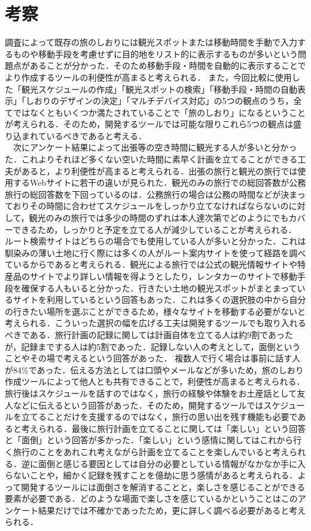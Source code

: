 \documentclass{funthesis}
\begin{document}
\section{考察}
調査によって既存の旅のしおりには観光スポットまたは移動時間を手動で入力するものや移動手段を考慮せずに目的地をリスト的に表示するものが多いという問題点があることが分かった．そのため移動手段・時間を自動的に表示することでより作成するツールの利便性が高まると考えられる．
また，今回比較に使用した「観光スケジュールの作成」「観光スポットの検索」「移動手段・時間の自動表示」「しおりのデザインの決定」「マルチデバイス対応」の5つの観点のうち，全てではなくともいくつか満たされていることで「旅のしおり」になるということが考えられる．そのため，開発するツールでは可能な限りこれら5つの観点は盛り込まれているべきであると考える．\\
　次にアンケート結果によって出張等の空き時間に観光する人が多いと分かった．これよりそれほど多くない空いた時間に素早く計画を立てることができる工夫があると，より利便性が高まると考えられる．出張の旅行と観光の旅行では使用するWebサイトに若干の違いが見られた．観光のみの旅行での総回答数が公務旅行の総回答数を下回っているのは．公務旅行の場合は公務の時間などが決まっておりその時間に合わせてスケジュールをしっかり立てなければならないのに対して，観光のみの旅行では多少の時間のずれは本人達次第でどのようにでもカバーできるため，しっかりと予定を立てる人が減少していることが考えられる．
ルート検索サイトはどちらの場合でも使用している人が多いと分かった．これは馴染みの薄い土地に行く際には多くの人がルート案内サイトを使って経路を調べているからであると考えられる．観光による旅行では公式の観光情報サイトや特産品のサイトでより詳しい情報を得ようとしたり，レンタカーのサイトで移動手段を確保する人もいると分かった．行きたい土地の観光スポットがまとまっているサイトを利用しているという回答もあった．これは多くの選択肢の中から自分の行きたい場所を選ぶことができるため，様々なサイトを移動する必要がないと考えられる．こういった選択の幅を広げる工夫は開発するツールでも取り入れるべきである．旅行計画の記録に関しては計画自体を立てる人は約9割であったが，記録までする人は約5割であった．記録しない人の考えとして，面倒ということやその場で考えるという回答があった．
複数人で行く場合は事前に話す人が84\%であった．伝える方法としては口頭やメールなどが多いため，旅のしおり作成ツールによって他人とも共有できることで，利便性が高まると考えられる．旅行後はスケジュールを話すのではなく，旅行の経験や体験をお土産話として友人などに伝えるという回答があった．そのため，開発するツールではスケジュールを立てることだけを支援するのではなく，旅行の思い出を残す機能も必要であると考えられる．最後に旅行計画を立てることに関しては「楽しい」という回答と「面倒」という回答が多かった．「楽しい」という感情に関してはこれから行く旅行のことをあれこれ考えながら計画を立てることを楽しんでいると考えられる．逆に面倒と感じる要因としては自分の必要としている情報がなかなか手に入らないことや，細かく記録を残すことを億劫に思う感情があると考えられる．よって開発するツールには面倒さを解消することと，楽しさを感じることができる要素が必要である．どのような場面で楽しさを感じているかということはこのアンケート結果だけでは不確かであったため，更に詳しく調べる必要があると考えられる．
\end{document}
